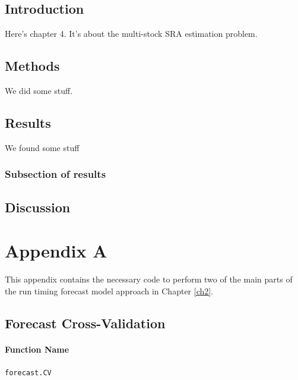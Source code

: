 \documentclass[12pt,]{book}
\theoremstyle{definition}
\theoremstyle{definition}
\theoremstyle{definition}
\theoremstyle{remark}
\begin{document}
\section{Introduction}\label{introduction-3}

Here's chapter 4. It's about the multi-stock SRA estimation problem.

\section{Methods}\label{methods-3}

We did some stuff.

\section{Results}\label{results-3}

We found some stuff

\subsection{Subsection of results}\label{subsection-of-results-2}

\section{Discussion}\label{discussion-3}

\chapter*{Appendix A}\label{appendix-a}

\noindent
This appendix contains the necessary code to perform two of the main
parts of the run timing forecast model approach in Chapter \ref{ch2}.

\section*{Forecast Cross-Validation}\label{forecast-cross-validation}

\subsubsection*{Function Name}\label{function-name}

\texttt{forecast.CV}
\end{document}
